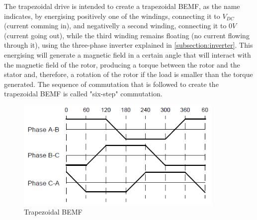 
The trapezoidal drive is intended to create a trapezoidal \ac{BEMF}, as the name indicates, by energising positively one of the windings, connecting it to $V_{DC}$ (current comming in), and negativelly a second winding, connecting it to $0V$ (current going out), while the third winding remains floating (no current flowing through it), using the three-phase inverter explained in \ref{subsection:inverter}. This energising will generate a magnetic field in a certain angle that will interact with the magnetic field of the rotor, producing a torque between the rotor and the stator and, therefore, a rotation of the rotor if the load is smaller than the torque generated. The sequence of commutation that is followed to create the trapezoidal \ac{BEMF} is called "six-step" commutation. 


\begin{figure}[htbp]
\centering
\includegraphics[width=10cm]{Images/trapezoidal_BEMF.png} 
\caption[Trapezoidal BEMF]{Trapezoidal BEMF}
\label{fig:trap_bemf}
\end{figure}


